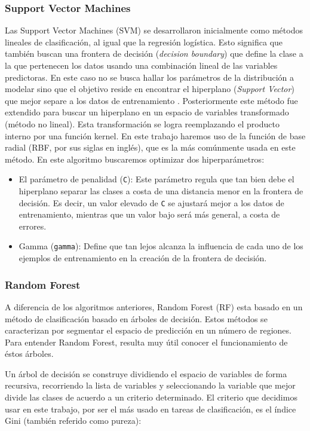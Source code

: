 \subsubsection{Support Vector Machines}

Las Support Vector Machines (SVM) se desarrollaron inicialmente como métodos lineales de clasificación, al igual que la regresión logística. Esto significa que también buscan una frontera de decisión (\textit{decision boundary}) que define la clase a la que pertenecen los datos usando una combinación lineal de las variables predictoras. En este caso no se busca hallar los parámetros de la distribución a modelar sino que el objetivo reside en encontrar el hiperplano (\textit{Support Vector}) que mejor separe a los datos de entrenamiento \cite{Hastie2001}. Posteriormente este método fue extendido para buscar un hiperplano en un espacio de variables transformado (método no lineal). Esta transformación se logra reemplazando el producto interno por una función kernel. En este trabajo haremos uso de la función de base radial (RBF, por sus siglas en inglés), que es la más comúnmente usada en este método. En este algoritmo buscaremos optimizar dos hiperparámetros: 

\begin{itemize}
    \item El parámetro de penalidad (\texttt{C}): Este parámetro regula que tan bien debe el hiperplano separar las clases a costa de una distancia menor en la frontera de decisión. Es decir, un valor elevado de \texttt{C} se ajustará mejor a los datos de entrenamiento, mientras que un valor bajo será más general, a costa de errores.
    \item Gamma (\texttt{gamma}): Define que tan lejos alcanza la influencia de cada uno de los ejemplos de entrenamiento en la creación de la frontera de decisión.  
\end{itemize}  

\subsubsection{Random Forest}

A diferencia de los algoritmos anteriores, Random Forest (RF) esta basado en un método de clasificación basado en árboles de decisión. Estos métodos se caracterizan por segmentar el espacio de predicción en un número de regiones. Para entender Random Forest, resulta muy útil conocer el funcionamiento de éstos árboles. 

Un árbol de decisión se construye dividiendo el espacio de variables de forma recursiva, recorriendo la lista de variables y seleccionando la variable que mejor divide las clases de acuerdo a un criterio determinado. El criterio que decidimos usar en este trabajo, por ser el más usado en tareas de clasificación, es el índice Gini (también referido como pureza):

